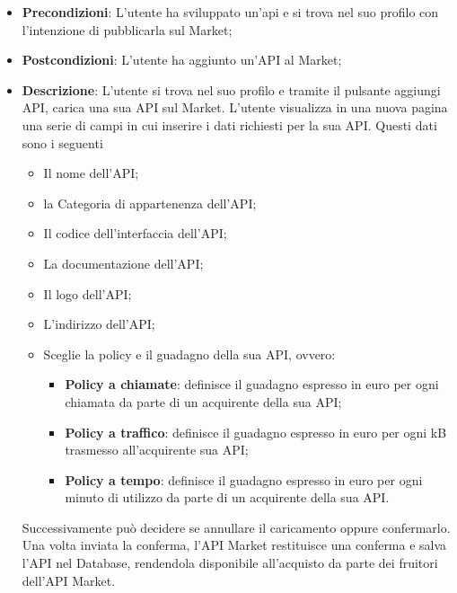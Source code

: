 \begin{itemize}
	\item \textbf{Precondizioni}: L'utente ha sviluppato un'api e si trova nel suo profilo con l'intenzione di pubblicarla sul Market;
	\item \textbf{Postcondizioni}: L'utente ha aggiunto un'API al Market;
	\item \textbf{Descrizione}: L'utente si trova nel suo profilo e tramite il pulsante aggiungi API, carica una sua API sul Market. L'utente visualizza in una nuova pagina una serie di campi in cui inserire i dati richiesti per la sua API. Questi dati sono i seguenti
	\begin{itemize}
		\item Il nome dell'API;
		\item la Categoria di appartenenza dell'API;
		\item Il codice dell'interfaccia dell'API;
		\item La documentazione dell'API;
		\item Il logo dell'API;
		\item L'indirizzo dell'API;
		\item Sceglie la policy e il guadagno della sua API, ovvero:
		\begin{itemize}
			\item \textbf{Policy a chiamate}: definisce il guadagno espresso in euro per ogni chiamata da parte di un acquirente della sua API;
			\item \textbf{Policy a traffico}: definisce il guadagno espresso in euro per ogni kB trasmesso all'acquirente sua API;
			\item \textbf{Policy a tempo}: definisce il guadagno espresso in euro per ogni minuto di utilizzo da parte di un acquirente della sua API.
		\end{itemize}		
	\end{itemize}
	Successivamente può decidere se annullare il caricamento oppure confermarlo. Una volta inviata la conferma, l'API Market restituisce una conferma e salva l'API nel Database, rendendola disponibile all'acquisto da parte dei fruitori dell'API Market.
\end{itemize}


